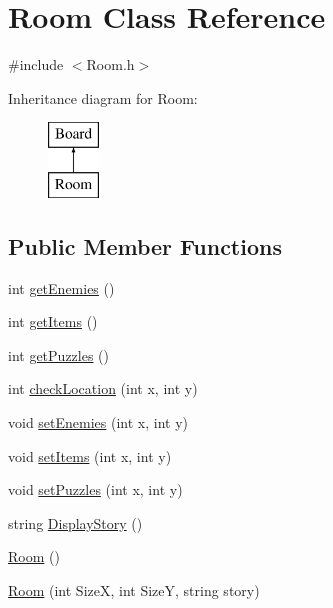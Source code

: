 \hypertarget{classRoom}{\section{Room Class Reference}
\label{classRoom}
}


{\ttfamily \#include $<$Room.\-h$>$}

Inheritance diagram for Room\-:\begin{figure}[H]
\begin{center}
\leavevmode
\includegraphics[height=2.000000cm]{classRoom}
\end{center}
\end{figure}
\subsection*{Public Member Functions}
\begin{DoxyCompactItemize}
\item 
int \hyperlink{classRoom_a0874cfd65ae662d303a76cf41d75ff54}{get\-Enemies} ()
\item 
int \hyperlink{classRoom_a4d403f9462e33100386c8f5212c86da5}{get\-Items} ()
\item 
int \hyperlink{classRoom_a0e6d02591ec2e376c91491a12a6bd7d1}{get\-Puzzles} ()
\item 
int \hyperlink{classRoom_a3b09aeaa36969f07f3571168b41b968a}{check\-Location} (int x, int y)
\item 
void \hyperlink{classRoom_a3470492d06e02fc83d696b49f2e9be7d}{set\-Enemies} (int x, int y)
\item 
void \hyperlink{classRoom_aeecd8c82b6670162ae42c619f4dd3f75}{set\-Items} (int x, int y)
\item 
void \hyperlink{classRoom_a185fc0aa127402dc97e092503e10f641}{set\-Puzzles} (int x, int y)
\item 
string \hyperlink{classRoom_a3dc925e6ea4c3e3f671b00307f53ebcd}{Display\-Story} ()
\item 
\hyperlink{classRoom_ac6ef93a7d9c3e1d624e025058d5f16ff}{Room} ()
\item 
\hyperlink{classRoom_a94326fb4bc4d1ad2c88e75d4211f8814}{Room} (int Size\-X, int Size\-Y, string story)
\end{DoxyCompactItemize}
